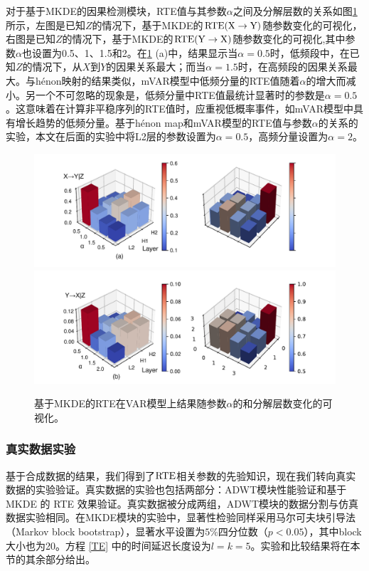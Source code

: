 对于基于MKDE的因果检测模块，RTE值与其参数$\alpha$之间及分解层数的关系如图\ref{figure7}所示，左图是已知$Z$的情况下，基于MKDE的$\rm{RTE}(X\rightarrow Y)$随参数变化的可视化，右图是已知$Z$的情况下，基于MKDE的$\rm{RTE}(Y\rightarrow X)$随参数变化的可视化,其中参数$\alpha$也设置为0.5、1、1.5和2。在\ref{figure7} (a)中，结果显示当$\alpha=0.5$时，低频段中，在已知$Z$的情况下，从$X$到$Y$的因果关系最大；而当$\alpha=1.5$时，在高频段的因果关系最大。与h\'{e}non映射的结果类似，mVAR模型中低频分量的RTE值随着$\alpha$的增大而减小。另一个不可忽略的现象是，低频分量中RTE值最统计显著时的参数是$\alpha=0.5$。这意味着在计算非平稳序列的RTE值时，应重视低概率事件，如mVAR模型中具有增长趋势的低频分量。基于h\'{e}non map和mVAR模型的RTE值与参数$\alpha$的关系的实验，本文在后面的实验中将L2层的参数设置为$\alpha=0.5$，高频分量设置为$\alpha=2$。
\begin{figure}[!ht]
\begin{center}
\includegraphics[scale=0.5]{./ch3/fig3_7.pdf}
\includegraphics[scale=0.5]{./ch3/fig3_8.pdf}
\caption{基于MKDE的RTE在VAR模型上结果随参数$\alpha$的和分解层数变化的可视化。} \label{figure7}
\end{center}
\end{figure}

\subsubsection{真实数据实验}
基于合成数据的结果，我们得到了$\rm{RTE}$相关参数的先验知识，现在我们转向真实数据的实验验证。真实数据的实验也包括两部分：ADWT模块性能验证和基于 MKDE 的 RTE 效果验证。真实数据被分成两组，ADWT模块的数据分割与仿真数据实验相同。在MKDE模块的实验中，显著性检验同样采用马尔可夫块引导法（Markov block bootstrap），显著水平设置为$5\%$四分位数（$p<0.05$），其中block大小也为20。方程 \eqref{TE} 中的时间延迟长度设为$l=k=5$。实验和比较结果将在本节的其余部分给出。


